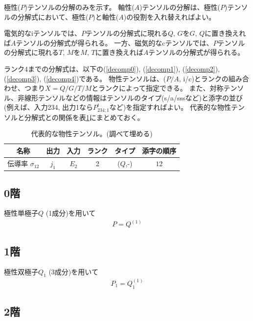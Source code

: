 \documentclass[11pt]{easymemo}
\begin{document}
極性($P$)テンソルの分解のみを示す。
軸性($A$)テンソルの分解は、極性($P$)テンソルの分解式において、極性($P$)と軸性($A$)の役割を入れ替えればよい。

電気的なiテンソルでは、$P$テンソルの分解式に現れる$Q$, $G$を$G$, $Q$に置き換えれば$A$テンソルの分解式が得られる。
一方、磁気的なcテンソルでは、$P$テンソルの分解式に現れる$T$, $M$を$M$, $T$に置き換えれば$A$テンソルの分解式が得られる。

ランク4までの分解式は、以下の(\ref{decomp0}), (\ref{decomp1}), (\ref{decomp2}), (\ref{decomp3}), (\ref{decomp4})である。
物性テンソルは、($P/A$, i/c)とランクの組み合わせ、つまり$X=Q/G/T/M$とランクによって指定できる。
また、対称テンソル、非線形テンソルなどの情報はテンソルのタイプ(s/a/sssなど)と添字の並び(例えば、入力234, 出力1なら$P_{234;1}^t$など)を指定すればよい。
代表的な物性テンソルと分解式との関係を表\ref{tbl:phystensor}にまとめておく。

\begin{table}[ht!]
\begin{center}
\caption{代表的な物性テンソル。(調べて埋める)
\label{tbl:phystensor}}
\renewcommand{\arraystretch}{1.3}
\begin{tabular}{cccccc} \hline \hline
名称 & 出力 & 入力 & ランク & タイプ & 添字の順序 \\ \hline
伝導率 $\sigma_{12}$ & $j_1$ & $E_2$ & 2 & ($Q$,-) & $12$ \\
\hline\hline
\end{tabular}
\end{center}
\end{table}


\subsection{0階}

極性単極子$Q$ (1成分)を用いて
\begin{align}
P=Q^{(1)}
\label{decomp0}
\end{align}

\subsection{1階}

極性双極子$Q_1$ (3成分)を用いて
\begin{align}
P_1=Q_1^{(1)}
\label{decomp1}
\end{align}

\subsection{2階}
\end{document}
